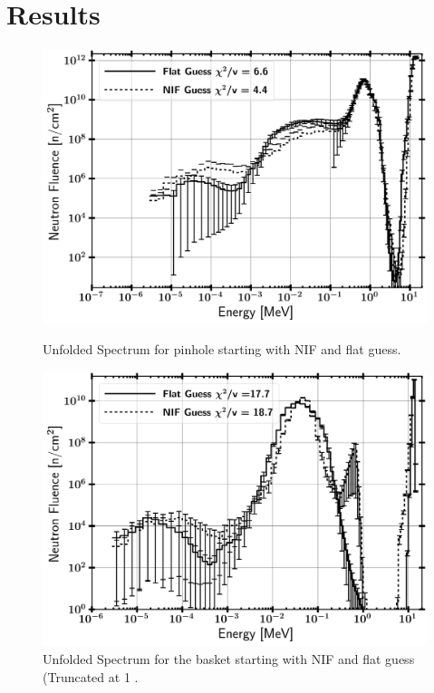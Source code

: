 \documentclass[journal]{IEEEtran}
\let\MYoriglatexcaption\caption
\renewcommand{\caption}[2][\relax]{\MYoriglatexcaption[#2]{#2}}
\begin{document}
	\section{Results}
	
	\begin{figure}[t!]
		\includegraphics[width=\linewidth]{Figures/PinBothLog.png}
		\caption{Unfolded Spectrum for pinhole starting with NIF and flat guess.}
		\label{fig:pin}
		\vskip 0.9cm
		\includegraphics[width=\linewidth]{Figures/BaskBothLogZoomed.png}
		\caption{Unfolded Spectrum for the basket starting with NIF and flat guess (Truncated at 1 \text{$n-cm^{-2}$)}.}

\end{figure}
\end{document}
